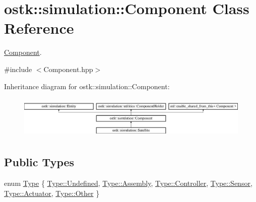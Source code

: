 \hypertarget{classostk_1_1simulation_1_1_component}{}\section{ostk\+:\+:simulation\+:\+:Component Class Reference}
\label{classostk_1_1simulation_1_1_component}


\hyperlink{classostk_1_1simulation_1_1_component}{Component}.  




{\ttfamily \#include $<$Component.\+hpp$>$}

Inheritance diagram for ostk\+:\+:simulation\+:\+:Component\+:\begin{figure}[H]
\begin{center}
\leavevmode
\includegraphics[height=2.066421cm]{classostk_1_1simulation_1_1_component}
\end{center}
\end{figure}
\subsection*{Public Types}
\begin{DoxyCompactItemize}
\item 
enum \hyperlink{classostk_1_1simulation_1_1_component_a1d2ded63a8ab0bd81e27f25921be1e20}{Type} \{ \newline
\hyperlink{classostk_1_1simulation_1_1_component_a1d2ded63a8ab0bd81e27f25921be1e20aec0fc0100c4fc1ce4eea230c3dc10360}{Type\+::\+Undefined}, 
\hyperlink{classostk_1_1simulation_1_1_component_a1d2ded63a8ab0bd81e27f25921be1e20ad75c45e11c8aeb13494dba59a388a164}{Type\+::\+Assembly}, 
\hyperlink{classostk_1_1simulation_1_1_component_a1d2ded63a8ab0bd81e27f25921be1e20a9bbf373797bf7cf7ba62c80023682e25}{Type\+::\+Controller}, 
\hyperlink{classostk_1_1simulation_1_1_component_a1d2ded63a8ab0bd81e27f25921be1e20a06b185256c71c1aec263c6e22bf8ef6b}{Type\+::\+Sensor}, 
\newline
\hyperlink{classostk_1_1simulation_1_1_component_a1d2ded63a8ab0bd81e27f25921be1e20aa2ec2ef7ebb614cf7dd5d78b9bbf59b3}{Type\+::\+Actuator}, 
\hyperlink{classostk_1_1simulation_1_1_component_a1d2ded63a8ab0bd81e27f25921be1e20a6311ae17c1ee52b36e68aaf4ad066387}{Type\+::\+Other}
 \}
\end{DoxyCompactItemize}
